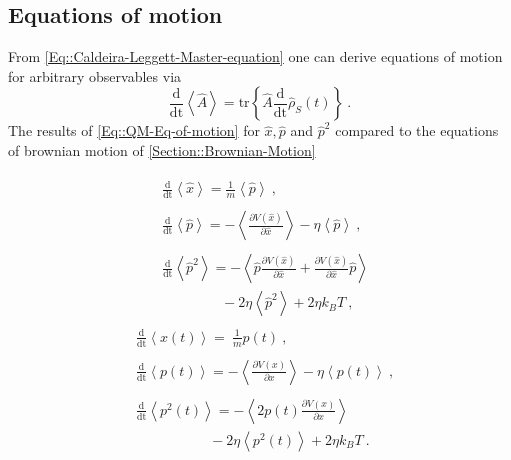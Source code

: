 	\subsection{Equations of motion}
	From \autoref{Eq::Caldeira-Leggett-Master-equation} one can derive equations of motion for arbitrary observables via
	\begin{equation}\label{Eq::QM-Eq-of-motion}
		\frac{\text{d}}{\text{dt}} \left \langle \hat{A} \right \rangle =	\text{tr} \left\{\hat{A} \frac{\text{d}}{\text{dt} } \hat{\rho}_S(t)\right\}~.
	\end{equation}
	The results of \autoref{Eq::QM-Eq-of-motion} for $\hat{x}, \hat{p}$ and $\hat{p}^2$ compared to the equations of brownian motion of \autoref{Section::Brownian-Motion} 
	\begin{multicols}{2}
		\noindent
		\begin{align*}
			\begin{split}
				&\frac{\text{d}}{\text{dt}} \left \langle \hat{x} \right \rangle =	\frac{1}{m} \left\langle \hat{p} \right \rangle~,
			\end{split}
			\\
			\begin{split}
				&\frac{\text{d}}{\text{dt}} \left \langle \hat{p} \right \rangle = - 	\left\langle  \frac{\partial V(\hat{x})}{\partial \hat{x}} \right \rangle - \eta \left \langle \hat{p} \right \rangle ~,
			\end{split}
			\\
			\begin{split}
				&\frac{\text{d}}{\text{dt}} \left \langle \hat{p}^2 \right \rangle =	- \left\langle \hat{p} \frac{\partial V(\hat{x})}{\partial \hat{x}} + \frac{\partial V(\hat{x})}{\partial \hat{x}} \hat{p} \right \rangle \\
				&\qquad \qquad ~- 2 \eta \left \langle \hat{p}^2 \right \rangle + 2 \eta k_B T ~,
			\end{split}		
		\end{align*}
			\begin{align*}
		\begin{split}
			&\frac{\text{d}}{\text{dt}} \left \langle {x}(t) \right \rangle  =	~\frac{1}{m} {p}(t) ~,
		\end{split}
		\\
		\begin{split}
			&\frac{\text{d}}{\text{dt}} \left \langle {p}(t) \right \rangle =	- 	\left \langle \frac{\partial V({x})}{\partial {x}} \right \rangle - \eta \left \langle {p}(t) \right \rangle ~,
		\end{split}
		\\
		\begin{split}
			&\frac{\text{d}}{\text{dt}} \left \langle {p}^2(t) \right \rangle = - \left\langle 2 {p}(t) \frac{\partial V({x})}{\partial {x}}\right \rangle \\
			&\qquad \qquad \quad ~ - 2 \eta \left \langle {p}^2(t) \right \rangle + 2 \eta k_B T~.
		\end{split}		
	\end{align*}
	\end{multicols}
